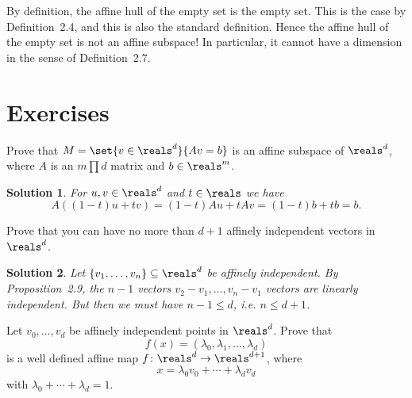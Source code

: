 \documentclass[article, a4paper, 11pt, oneside]{memoir}
\numberwithin{equation}{chapter}
\theoremstyle{nonumberplain}
\newtheorem{solution}{Solution}
\begin{document}
\begin{remarkbreak}
    By definition, the affine hull of the empty set is the empty set. This is the case by Definition~2.4, and this is also the standard definition. Hence the affine hull of the empty set is not an affine subspace! In particular, it cannot have a dimension in the sense of Definition~2.7.
\end{remarkbreak}


\section*{Exercises}


\begin{exerciseframed*}[4]
    Prove that $M = \set{v \in \reals^d}{Av = b}$ is an affine subspace of $\reals^d$, where $A$ is an $m \prod d$ matrix and $b \in \reals^m$.
\end{exerciseframed*}

\begin{solution}
    For $u,v \in \reals^d$ and $t \in \reals$ we have
    \begin{equation*}
        A((1-t)u + tv)
            = (1-t)Au + tAv
            = (1-t)b + tb
            = b.
    \end{equation*}
\end{solution}


\begin{exerciseframed*}[10]
    Prove that you can have no more than $d+1$ affinely independent vectors in $\reals^d$.
\end{exerciseframed*}

\begin{solution}
    Let $\{v_1, \ldots, v_n\} \subseteq \reals^d$ be affinely independent. By Proposition~2.9, the $n-1$ vectors $v_2 - v_1, \ldots, v_n - v_1$ vectors are linearly independent. But then we must have $n-1 \leq d$, i.e. $n \leq d+1$.
\end{solution}


\begin{exerciseframed*}[11]
    Let $v_0, \ldots, v_d$ be affinely independent points in $\reals^d$. Prove that
    \begin{equation*}
        f(x) = (\lambda_0, \lambda_1, \ldots, \lambda_d)
    \end{equation*}
    is a well defined affine map $f \colon \reals^d \to \reals^{d+1}$, where
    \begin{equation*}
        x = \lambda_0 v_0 + \cdots + \lambda_d v_d
    \end{equation*}
    with $\lambda_0 + \cdots + \lambda_d = 1$.
\end{exerciseframed*}
\end{document}
